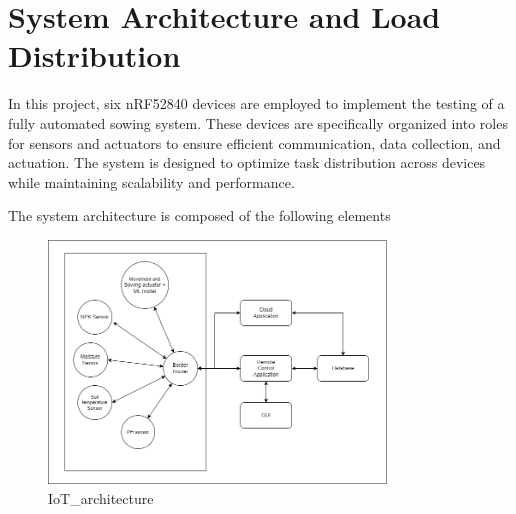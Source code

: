 \chapter{System Architecture and Load Distribution}

In this project, six nRF52840 devices are employed to implement the testing of a fully automated sowing system. These devices are specifically organized into roles for sensors and actuators to ensure efficient communication, data collection, and actuation. The system is designed to optimize task distribution across devices while maintaining scalability and performance.

The system architecture is composed of the following elements

\begin{figure}[H]
    \centering
    \includegraphics[width=0.8\textwidth]{media/IoT_architecture.png}
    \caption{IoT_architecture}
    \label{fig:IoT_architecture}
\end{figure}

